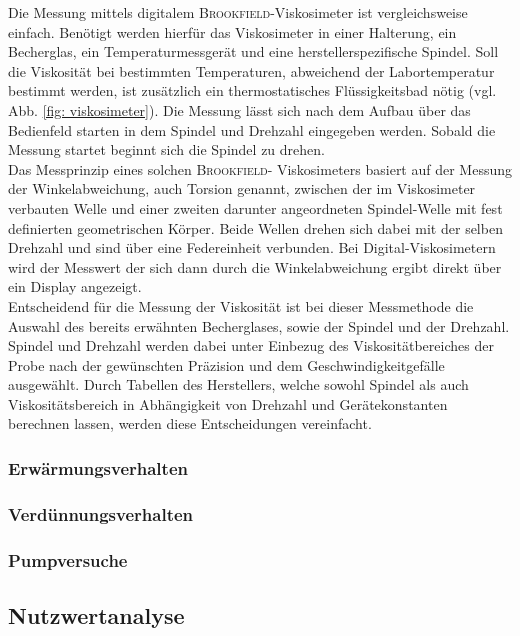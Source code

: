 Die Messung mittels digitalem \textsc{Brookfield}-Viskosimeter ist vergleichsweise einfach. Benötigt werden hierfür das Viskosimeter in einer Halterung, ein Becherglas, ein Temperaturmessgerät und eine herstellerspezifische Spindel. Soll die Viskosität bei bestimmten Temperaturen, abweichend der Labortemperatur bestimmt werden, ist zusätzlich ein thermostatisches Flüssigkeitsbad nötig (vgl. Abb. \ref{fig: viskosimeter}). \newpage 
Die Messung lässt sich nach dem Aufbau über das Bedienfeld starten in dem Spindel und Drehzahl eingegeben werden. Sobald die Messung startet beginnt sich die Spindel zu drehen.\\
Das Messprinzip eines solchen \textsc{Brookfield}- \linebreak Viskosimeters basiert auf der Messung der Winkelabweichung, auch Torsion genannt, zwischen der im Viskosimeter verbauten Welle und einer zweiten darunter angeordneten Spindel-Welle mit fest definierten geometrischen Körper. Beide Wellen drehen sich dabei mit der selben Drehzahl  und sind über eine Federeinheit verbunden. Bei Digital-Viskosimetern wird der Messwert der sich dann durch die Winkelabweichung ergibt direkt über ein Display angezeigt.\\
Entscheidend für die Messung der Viskosität ist bei dieser Messmethode die Auswahl des bereits erwähnten Becherglases, sowie der Spindel und der Drehzahl. Spindel und Drehzahl werden dabei unter Einbezug des Viskositätbereiches der Probe nach der gewünschten Präzision und dem Geschwindigkeitgefälle ausgewählt. \cite{DINDeutschesInstitutfurNormunge.V..September2018} 
Durch Tabellen des Herstellers, welche sowohl Spindel als auch Viskositätsbereich in Abhängigkeit von Drehzahl und Gerätekonstanten berechnen lassen, werden diese Entscheidungen vereinfacht. \cite{brookfield_31.01.2022} 

\subsubsection{Erwärmungsverhalten}
\subsubsection{Verdünnungsverhalten}
\subsubsection{Pumpversuche}

\subsection{Nutzwertanalyse}

